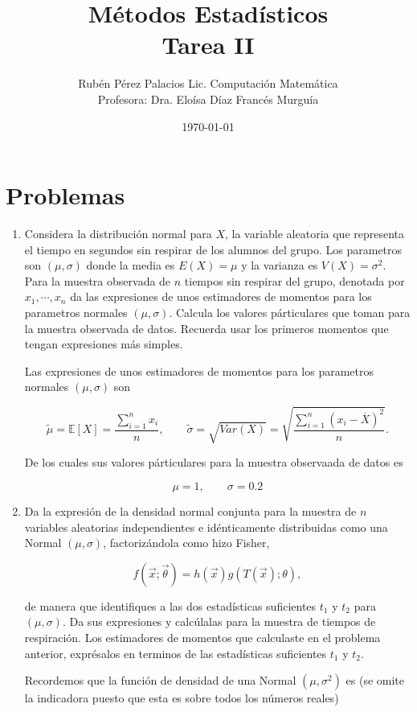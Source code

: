\documentclass[letterpaper]{article}
\title{Métodos Estadísticos \\Tarea II}
\author{Rubén Pérez Palacios Lic. Computación Matemática\\Profesora: Dra. Eloísa Díaz Francés Murguía}
\date{\today}
\theoremstyle{definition}
\theoremstyle{lemathm}
\theoremstyle{lemathm}
\theoremstyle{lemathm}
\theoremstyle{lemademthm}
\newcommand{\pars}[1]{\left( #1 \right) }
\newcommand{\bracs}[1]{\left[ #1 \right] }
\newcommand{\EE}{\mathbb{E}}
\newcommand{\1}{\mathbbm{1}}
\begin{document}
	\maketitle
    
    \section*{Problemas}

	\begin{enumerate}
		\item Considera la distribución normal para $X$, la variable aleatoria que representa el tiempo en segundos sin respirar de los alumnos del grupo. Los parametros son $(\mu,\sigma)$ donde la media es $E(X) = \mu$ y la varianza es $V(X) = \sigma^2$. Para la muestra observada de $n$ tiempos sin respirar del grupo, denotada por $x_1,\cdots,x_n$ da las expresiones de unos estimadores de momentos para los parametros normales $(\mu,\sigma)$. Calcula los valores párticulares que toman para la muestra observada de datos. Recuerda usar los primeros momentos que tengan expresiones más simples.
		
		Las expresiones de unos estimadores de momentos para los parametros normales $(\mu,\sigma)$ son

		\[\tilde{\mu} = \EE\bracs{X} = \frac{\sum_{i=1}^n x_i}{n},\qquad \tilde{\sigma} = \sqrt{Var\pars{X}} = \sqrt{\frac{\sum_{i=1}^n \pars{x_i-\overline{X}}^2}{n}}.\]

		De los cuales sus valores párticulares para la muestra observaada de datos es

		\[\mu = 1,\qquad \sigma = 0.2\]

		\item Da la expresión de la densidad normal conjunta para la muestra de $n$ variables aleatorias independientes e idénticamente distribuidas como una Normal $(\mu,\sigma)$, factorizándola como hizo Fisher,
		
		\[f\pars{\vec{x};\vec{\theta}} = h\pars{\vec{x}}g\pars{T\pars{\vec{x}};\theta},\]

		de manera que identifiques a las dos estadísticas suficientes $t_1$ y $t_2$ para $\pars{\mu,\sigma}$. Da sus expresiones y calcúlalas para la muestra de tiempos de respiración. Los estimadores de momentos que calculaste en el problema anterior, exprésalos en terminos de las estadísticas suficientes $t_1$ y $t_2$.

		Recordemos que la función de densidad de una Normal $\pars{\mu,\sigma^2}$ es (se omite la indicadora puesto que esta es sobre todos los números reales)
		

\end{enumerate}
\end{document}
